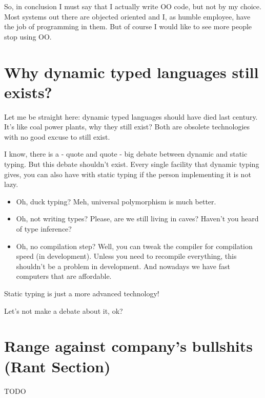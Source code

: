 \documentclass[11pt,a4paper,sans]{moderncv}
\begin{document}
So, in conclusion I must say that I actually write OO code, but not by my choice.
Most systems out there are objected oriented and I, as humble employee, have the job of programming in them.
But of course I would like to see more people stop using OO.

\section{Why dynamic typed languages still exists?}
Let me be straight here:
dynamic typed languages should have died last century.
It's like coal power plants, why they still exist?
Both are obsolete technologies with no good excuse to still exist.

I know, there is a - quote and quote - big debate between dynamic and static typing.
But this debate shouldn't exist.
Every single facility that dynamic typing gives, you can also have with static typing if the person implementing it is not lazy.

\begin{itemize}
  \item Oh, duck typing? Meh, universal polymorphism is much better.
  \item Oh, not writing types? Please, are we still living in caves? Haven't you heard of type inference?
  \item Oh, no compilation step? Well, you can tweak the compiler for compilation speed (in development).
        Unless you need to recompile everything, this shouldn't be a problem in development.
        And nowadays we have fast computers that are affordable.
\end{itemize}

Static typing is just a more advanced technology!

Let's not make a debate about it, ok?

\section{Range against company's bullshits (Rant Section)}
TODO
\end{document}
